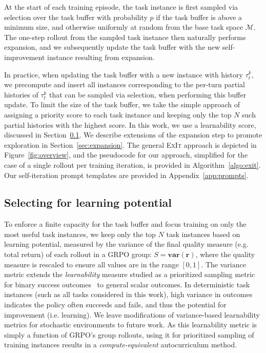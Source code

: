 \documentclass[10pt]{article} %
\newcommand{\methodname}{\textsc{ExIt}}
\begin{document}
At the start of each training episode, the task instance is first sampled via selection over the task buffer with probability $p$ if the task buffer is above a minimum size, and otherwise uniformly at random from the base task space $\mathcal{M}$. The one-step rollout from the sampled task instance then naturally performs expansion, and we subsequently update the task buffer with the new self-improvement instance resulting from expansion.

In practice, when updating the task buffer with a new instance with history $\tau^k_t$, we precompute and insert all instances corresponding to the per-turn partial histories of $\tau^k_t$ that can be sampled via selection, when performing this buffer update. To limit the size of the task buffer, we take the simple approach of assigning a priority score to each task instance and keeping only the top $N$ such partial histories with the highest score. In this work, we use a learnability score, discussed in Section~\ref{sec:selection}. We describe extensions of the expansion step to promote exploration in Section~\ref{sec:expansion}. The general \methodname{} approach is depicted in Figure~\ref{fig:overview}, and the pseudocode for our approach, simplified for the case of a single rollout per training iteration, is provided in Algorithm~\ref{algo:exit}. Our self-iteration prompt templates are provided in Appendix~\ref{app:prompts}.

\subsection{Selecting for learning potential}
\label{sec:selection}
To enforce a finite capacity for the task buffer and focus training on only the most useful task instances, we keep only the top $N$ task instances based on learning potential, measured by the variance of the final quality measure (e.g. total return) of each rollout in a GRPO group: $S = \textbf{var}(\textbf{r})$, where the quality measure is rescaled to ensure all values are in the range $[0, 1]$.
The variance metric extends the \emph{learnability} measure studied as a prioritized sampling metric for binary success outcomes~\citep{vinyals2019grandmaster, rutherford2024no} to general scalar outcomes. In deterministic task instances (such as all tasks considered in this work), high variance in outcomes indicates the policy often succeeds and fails, and thus the potential for improvement (i.e. learning). We leave modifications of variance-based learnability metrics for stochastic environments to future work. As this learnability metric is simply a function of GRPO's group rollouts, using it for prioritized sampling of training instances results in a \emph{compute-equivalent} autocurriculum method. 
\end{document}
